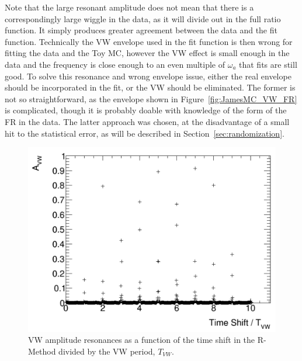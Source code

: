\documentclass[12pt,letterpaper]{article}
\newcommand{\figref}[1]{Figure~\ref{#1}}
\def\wa{$\omega_{a}$\xspace}
\begin{document}
Note that the large resonant amplitude does not mean that there is a correspondingly large wiggle in the data, as it will divide out in the full ratio function. It simply produces greater agreement between the data and the fit function. Technically the VW envelope used in the fit function is then wrong for fitting the data and the Toy MC, however the VW effect is small enough in the data and the frequency is close enough to an even multiple of \wa that fits are still good. To solve this resonance and wrong envelope issue, either the real envelope should be incorporated in the fit, or the VW should be eliminated. The former is not so straightforward, as the envelope shown in \figref{fig:JamesMC_VW_FR} is complicated, though it is probably doable with knowledge of the form of the FR in the data. The latter approach was chosen, at the disadvantage of a small hit to the statistical error, as will be described in Section~\ref{sec:randomization}.



\begin{figure}[]
    \centering
    \includegraphics[width=.7\textwidth]{JamesAnalytic_Avw_Resonances}
    \caption[]{VW amplitude resonances as a function of the time shift in the R-Method divided by the VW period, $T_{VW}$.}
    \label{fig:JamesAnalytic_Avw_Resonances}
\end{figure}
\end{document}
